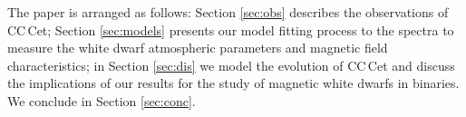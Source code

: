 \documentclass[fleqn,usenatbib]{mnras}
\newcommand{\bgc}[1]{\textcolor{orange}{[#1]}}
\begin{document}
The paper is arranged as follows: Section \ref{sec:obs} describes the observations of CC\,Cet; Section \ref{sec:models} presents our model fitting process to the spectra to measure the white dwarf atmospheric parameters and magnetic field characteristics; in Section \ref{sec:dis} we model the evolution of CC\,Cet and discuss the implications of our results for the study of magnetic white dwarfs in binaries. We conclude in Section \ref{sec:conc}.  



\end{document}
